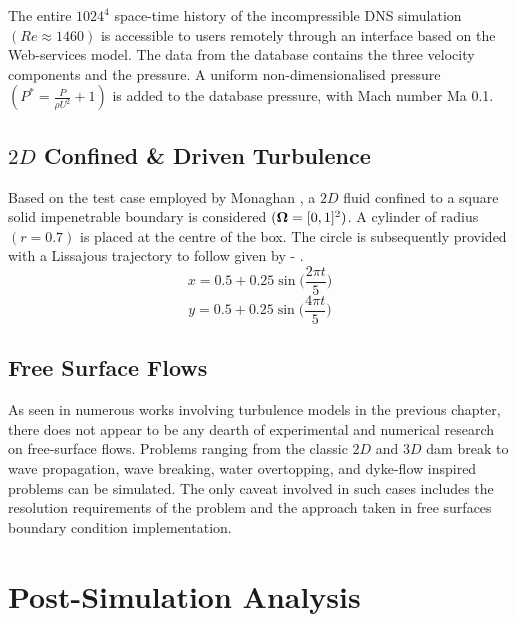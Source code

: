 The entire $1024^4$ space-time history of the incompressible DNS simulation $(Re\approx1460)$ is accessible to users remotely through an interface based on the Web-services model. 
The data from the database contains the three velocity components and the pressure. A uniform non-dimensionalised pressure $(P^* = \frac{P}{\rho U^2} + 1)$ is added to the
database pressure, with Mach number Ma 0.1. 

\subsection{$2D$ Confined \& Driven Turbulence}
Based on the test case employed by Monaghan \parencite{Monaghan2017}, a $2D$ fluid confined to a square solid impenetrable boundary is considered $(\bm{\Omega} = [0,1]^2)$. A cylinder of radius $(r=0.7)$ is placed at the centre of the box. The circle is subsequently provided with a Lissajous trajectory to follow given by  - .
\begin{equation}
    x = 0.5 + 0.25 \sin \bigg( \frac{2\pi t}{5} \bigg)
    \label{eq:2d-cdt-x}
\end{equation}
\begin{equation}
    y = 0.5 + 0.25 \sin \bigg( \frac{4\pi t}{5} \bigg)
    \label{eq:2d-cdt-y}
\end{equation}

\subsection{Free Surface Flows}
As seen in numerous works involving turbulence models in the previous chapter, there does not appear to be any dearth of experimental and numerical research on free-surface flows. Problems ranging from the classic $2D$ and $3D$ dam break to wave propagation, wave breaking, water overtopping, and dyke-flow inspired problems can be simulated. The only caveat involved in such cases includes the resolution requirements of the problem and the approach taken in free surfaces boundary condition implementation.

\section{Post-Simulation Analysis}
